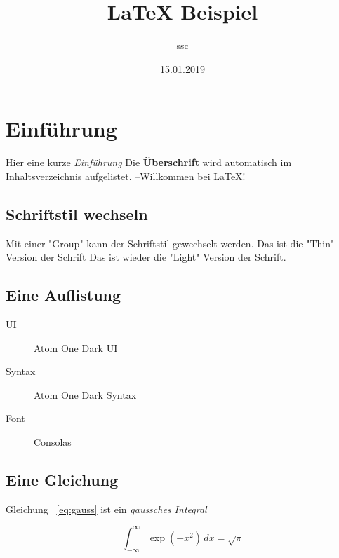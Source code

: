 \documentclass[a4paper]{article}
\title{LaTeX Beispiel}
\author{ssc}
\date{15.01.2019}
\begin{document}
\maketitle
\tableofcontents

\section{Einführung}
  Hier eine kurze \textit{Einführung}
  Die \textbf{Überschrift} wird automatisch im Inhaltsverzeichnis
  aufgelistet.
  --Willkommen bei \LaTeX{}!

\subsection{Schriftstil wechseln}
  Mit einer "Group" kann der Schriftstil gewechselt werden. \newline
  \begingroup
  \selectfont
  Das ist die "Thin" Version der Schrift \newline
  \endgroup
  Das ist wieder die "Light" Version der Schrift.

\subsection{Eine Auflistung}
    \begin{description}
        \item [UI]      Atom One Dark UI
        \item [Syntax]  Atom One Dark Syntax
        \item [Font]    Consolas
    \end{description}

\subsection{Eine Gleichung}
  Gleichung ~\eqref{eq:gauss} ist ein \emph{gaussches Integral}

    \begin{equation}
        \int_{-\infty}^{\infty}\exp(-x^2)\,dx = \sqrt{\pi} \label{eq:gauss}
    \end{equation}
\end{document}

